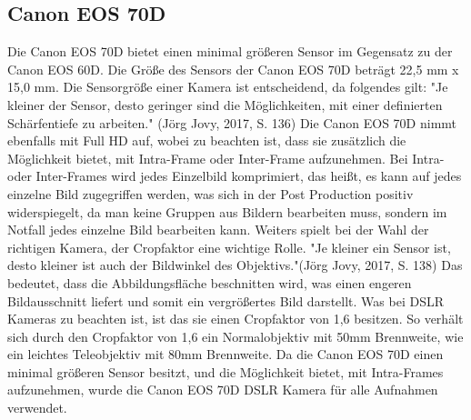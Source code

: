 \subsection{Canon EOS 70D}
Die Canon EOS 70D bietet einen minimal größeren Sensor im Gegensatz zu der Canon EOS 60D. Die Größe des Sensors der Canon EOS 70D beträgt 22,5 mm x 15,0 mm. Die Sensorgröße einer Kamera ist entscheidend, da folgendes gilt: "Je kleiner der Sensor, desto geringer sind die Möglichkeiten, mit einer definierten Schärfentiefe zu arbeiten." (Jörg Jovy, 2017, S. 136)\newline
Die Canon EOS 70D nimmt ebenfalls mit Full HD auf, wobei zu beachten ist, dass sie zusätzlich die Möglichkeit bietet, mit Intra-Frame oder Inter-Frame aufzunehmen.\citep{canon70} Bei Intra- oder Inter-Frames wird jedes Einzelbild komprimiert, das heißt, es kann auf jedes einzelne Bild zugegriffen werden\citep{intra}, was sich in der Post Production positiv widerspiegelt, da man keine Gruppen aus Bildern bearbeiten muss, sondern im Notfall jedes einzelne Bild bearbeiten kann. Weiters spielt bei der Wahl der richtigen Kamera, der Cropfaktor eine wichtige Rolle. "Je kleiner ein Sensor ist, desto kleiner ist auch der Bildwinkel des Objektivs."(Jörg Jovy, 2017, S. 138)\newline
Das bedeutet, dass die Abbildungsfläche beschnitten wird, was einen engeren Bildausschnitt liefert und somit ein vergrößertes Bild darstellt. Was bei DSLR Kameras zu beachten ist, ist das sie einen Cropfaktor von 1,6 besitzen. So verhält sich durch den Cropfaktor von 1,6 ein Normalobjektiv mit 50mm Brennweite, wie ein leichtes Teleobjektiv mit 80mm Brennweite.\citep{crop}
Da die Canon EOS 70D einen minimal größeren Sensor besitzt, und die Möglichkeit bietet, mit Intra-Frames aufzunehmen, wurde die Canon EOS 70D DSLR Kamera für alle Aufnahmen verwendet.
